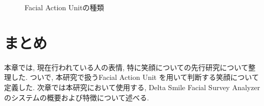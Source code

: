 \begin{figure}[htbp]
    \begin{center}
    \end{center}
    \caption{Facial Action Unitの種類}
    \label{fig:faus2}
\end{figure}


\section{まとめ}
本章では, 現在行われている人の表情, 特に笑顔についての先行研究について整理した.
ついで, 本研究で扱うFacial Action Unit を用いて判断する笑顔について定義した.
次章では本研究において使用する, Delta Smile Facial Survey Analyzer のシステムの概要および特徴について述べる.

